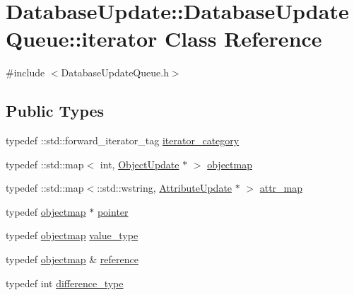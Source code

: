 \hypertarget{class_database_update_1_1_database_update_queue_1_1iterator}{}\section{Database\+Update\+:\+:Database\+Update\+Queue\+:\+:iterator Class Reference}
\label{class_database_update_1_1_database_update_queue_1_1iterator}


{\ttfamily \#include $<$Database\+Update\+Queue.\+h$>$}

\subsection*{Public Types}
\begin{DoxyCompactItemize}
\item 
typedef \+::std\+::forward\+\_\+iterator\+\_\+tag \hyperlink{class_database_update_1_1_database_update_queue_1_1iterator_aa97dea92e49d9e5d9dfd23e5547f3f45}{iterator\+\_\+category}
\item 
typedef \+::std\+::map$<$ int, \hyperlink{class_database_update_1_1_object_update}{Object\+Update} $\ast$ $>$ \hyperlink{class_database_update_1_1_database_update_queue_1_1iterator_adb1bf22b239824b25c78180cbd584fb8}{objectmap}
\item 
typedef \+::std\+::map$<$\+::std\+::wstring, \hyperlink{class_database_update_1_1_attribute_update}{Attribute\+Update} $\ast$ $>$ \hyperlink{class_database_update_1_1_database_update_queue_1_1iterator_a1592e8e7815b536c6e419a383935913b}{attr\+\_\+map}
\item 
typedef \hyperlink{class_database_update_1_1_database_update_queue_1_1iterator_adb1bf22b239824b25c78180cbd584fb8}{objectmap} $\ast$ \hyperlink{class_database_update_1_1_database_update_queue_1_1iterator_ad4b0114dbec483b1e2148ea9736bf6d6}{pointer}
\item 
typedef \hyperlink{class_database_update_1_1_database_update_queue_1_1iterator_adb1bf22b239824b25c78180cbd584fb8}{objectmap} \hyperlink{class_database_update_1_1_database_update_queue_1_1iterator_a6c0a55816bed4855f15d36b8c2fbe865}{value\+\_\+type}
\item 
typedef \hyperlink{class_database_update_1_1_database_update_queue_1_1iterator_adb1bf22b239824b25c78180cbd584fb8}{objectmap} \& \hyperlink{class_database_update_1_1_database_update_queue_1_1iterator_a9268647f1d1c17503c8af12faacc761a}{reference}
\item 
typedef int \hyperlink{class_database_update_1_1_database_update_queue_1_1iterator_afd453e8c03f82a4ad9b36ff0c7e3dac6}{difference\+\_\+type}
\end{DoxyCompactItemize}
